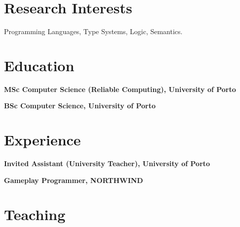 \documentclass[11pt,a4paper]{moderncv}
\begin{document}
\makecvtitle

\vspace*{-.5in}


\section{Research Interests}

Programming Languages, Type Systems, Logic, Semantics.


\section{Education}

\begin{description}[labelwidth=60pt,align=right,leftmargin=!]
    \item[\normalfont{\emph{2019 -- 2023}}] \textbf{MSc Computer Science (Reliable Computing), University of Porto}
    \item[\normalfont{\emph{2016 -- 2019}}] \textbf{BSc Computer Science, University of Porto}
\end{description}


\section{Experience}

\begin{description}[labelwidth=60pt,align=right,leftmargin=!]
    \item[\normalfont{\emph{2023 -- curr}}] \textbf{Invited Assistant (University Teacher), University of Porto}
    \item[\normalfont{\emph{2021 -- 2022}}] \textbf{Gameplay Programmer, NORTHWIND}
\end{description}


\section{Teaching}
\end{document}
